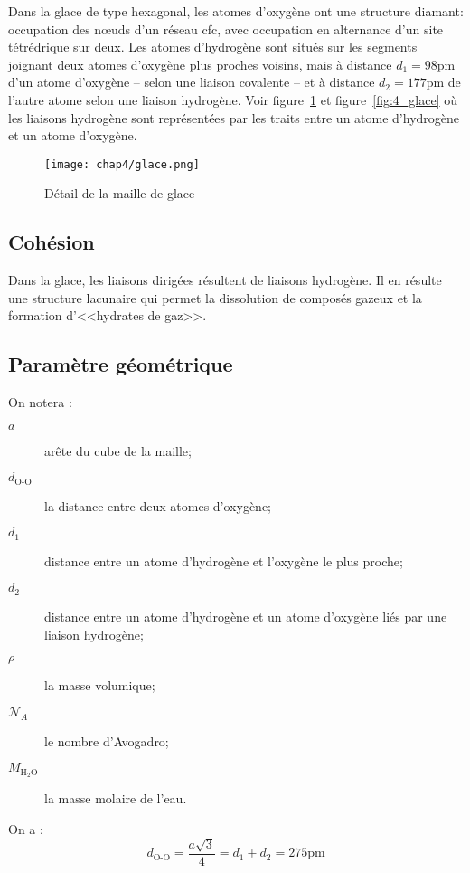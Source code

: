 Dans la glace de type hexagonal, les atomes d’oxygène
ont une structure diamant: occupation des nœuds d’un
réseau cfc, avec occupation en alternance d’un
site tétrédrique sur deux.
Les atomes d’hydrogène sont situés sur les segments
joignant deux atomes d’oxygène plus proches voisins,
mais à distance $d_1=98$pm d’un atome d’oxygène -- selon
une liaison covalente -- et à distance $d_2= 177$pm
de l’autre atome selon une liaison hydrogène.
Voir figure~\ref{fig:4_tétraèdre_glace} et
figure~\ref{fig:4_glace} où les liaisons hydrogène sont
représentées par les traits entre un atome d'hydrogène
et un atome d'oxygène.
\begin{figure}
    \centering
    \texttt{[image: chap4/glace.png]}
    \caption{Détail de la maille de glace}
    \label{fig:4_tétraèdre_glace}
\end{figure}

\subsection{Cohésion}
Dans la glace, les liaisons dirigées résultent de liaisons
hydrogène. Il en résulte une structure lacunaire qui permet
la dissolution de composés gazeux et la formation
d’<<hydrates de gaz>>.

\subsection{Paramètre géométrique}
On notera :
\begin{description}
    \item[$a$] arête du cube de la maille;
    \item[$d_\text{O-O}$] la distance entre deux atomes
        d'oxygène;
    \item[$d_1$] distance entre un atome d'hydrogène et
        l'oxygène le plus proche;
    \item[$d_2$] distance entre un atome d'hydrogène
        et un atome d'oxygène liés par une liaison hydrogène;
    \item[$\rho$] la masse volumique;
    \item[$\mathcal{N}_A$] le nombre d'Avogadro;
    \item[$M_{\text{H}_2\text{O}}$] la masse molaire de
        l'eau.
\end{description}
On a :
\begin{equation}
    d_\text{O-O} = \frac{a\sqrt{3}}{4} = d_1 + d_2
    = 275\text{pm}
\end{equation}

